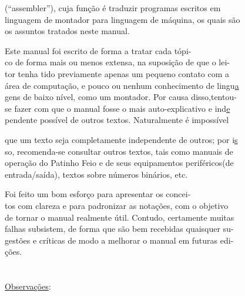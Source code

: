 \documentclass[a4paper,12pt]{article}
\begin{document}
(``assembler''), cuja função é traduzir programas escritos \hfill em\\
linguagem de montador para linguagem de máquina, os quais \hfill são\\
os assuntos tratados neste manual.\\
\par
Este manual foi escrito de forma a tratar cada tópi-\\
co de forma mais ou menos extensa, na suposição de que o \hfill lei-\\
tor tenha tido previamente apenas um pequeno contato com \hfill a\\
área de computação, e pouco ou nenhum conhecimento de \hfill lingu\uline a\\
gens de baixo nível, como um montador. Por causa disso,tentou-\\
se fazer com que o manual fosse o mais auto-explicativo e ind\uline e\\
pendente possível de outros textos. Naturalmente é \hfill impossível

\newpage

\noindent que um texto seja completamente independente de outros; por i\uline s\\
so, recomenda-se consultar outros textos, tais como manuais de\\
operação do Patinho Feio e de seus equipamentos periféricos(de\\
entrada/saída), textos sobre números binários, etc.\\
\par
Foi feito um bom esforço para apresentar os \hfill concei-\\
tos com clareza e para padronizar as notações, com o \hfill objetivo\\
de tornar o manual realmente útil. Contudo, certamente \hfill muitas\\
falhas subsistem, de forma que são bem recebidas quaisquer su-\\
gestões e críticas de modo a melhorar o manual em futuras edi-\\
ções.\\
\\
\\[-0.5em]
\uline{Observações}:
\end{document}
